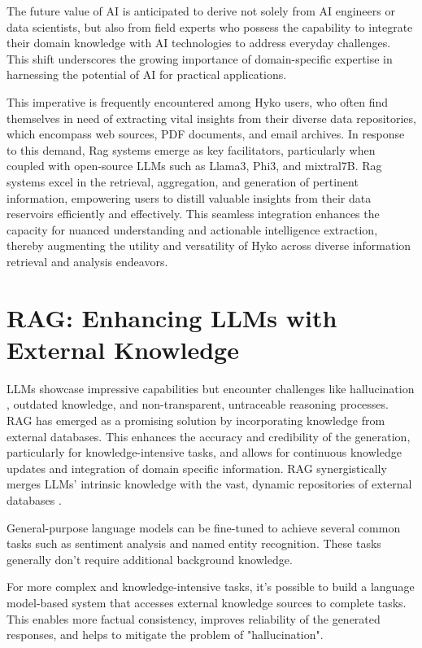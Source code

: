 The future value of AI is anticipated to derive not solely from AI engineers or data scientists, but also from field experts who possess the capability to integrate their domain knowledge with AI technologies to address everyday challenges. This shift underscores the growing importance of domain-specific expertise in harnessing the potential of AI for practical applications.

This imperative is frequently encountered among Hyko users, who often find themselves in need of extracting vital insights from their diverse data repositories, which encompass web sources, PDF documents, and email archives. In response to this demand, Rag systems emerge as key facilitators, particularly when coupled with open-source LLMs such as Llama3, Phi3, and mixtral7B. Rag systems excel in the retrieval, aggregation, and generation of pertinent information, empowering users to distill valuable insights from their data reservoirs efficiently and effectively. This seamless integration enhances the capacity for nuanced understanding and actionable intelligence extraction, thereby augmenting the utility and versatility of Hyko across diverse information retrieval and analysis endeavors.

\section{RAG: Enhancing LLMs with External Knowledge}

LLMs showcase impressive capabilities but encounter challenges like hallucination \cite{zhang2023sirens}, outdated knowledge, and non-transparent, untraceable reasoning processes. RAG has emerged as a promising solution by incorporating knowledge from external databases. This enhances the accuracy and credibility of the generation, particularly for knowledge-intensive tasks, and allows for continuous knowledge updates and integration of domain specific information. RAG synergistically merges LLMs' intrinsic knowledge with the vast, dynamic repositories of external databases \cite{gao2024retrievalaugmented}.

General-purpose language models can be fine-tuned to achieve several common tasks such as sentiment analysis and named entity recognition. These tasks generally don't require additional background knowledge.

For more complex and knowledge-intensive tasks, it's possible to build a language model-based system that accesses external knowledge sources to complete tasks. This enables more factual consistency, improves reliability of the generated responses, and helps to mitigate the problem of "hallucination".

